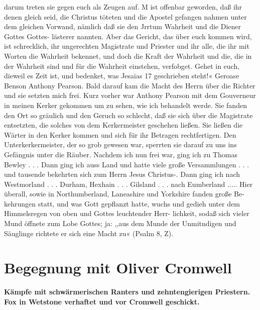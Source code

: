 darum treten sie gegen euch als Zeugen auf. M ist offenbar
geworden, daß ihr denen gleich seid, die Christus töteten und die
Apostel gefangen nahmen unter dem gleichen Vorwand, nämlich
daß sie den Jrrtum Wahrheit und die Diener Gottes Gottes-
lästerer nannten. Aber das Gericht, das über euch kommen wird,
ist schrecklich, ihr ungerechten Magistrate und Priester und ihr
alle, die ihr mit Worten die Wahrheit bekennet, und doch die
Kraft der Wahrheit und die, die in der Wahrheit sind und für die
Wahrheit einstehen, verfobget. Gehet in euch, dieweil es Zeit
ist, und bedenket, was Jesaias 17 geschrieben steht!«
Geroase Benson
Anthony Pearson.
Bald darauf kam die Macht des Herrn über die Richter
und sie setzten mich frei. Kurz vorher war Anthony Pearson
mit dem Gouverneur in meinen Kerker gekommen um zu sehen,
wie ich behandelt werde. Sie fanden den Ort so gräulich und
den Geruch so schlecht, daß sie sich über die Magistrate entsetzten,
die solches von dem Kerkermeister geschehen ließen. Sie ließen
die Wärter in den Kerker kommen und sich für ihr Betragen
rechtfertigen. Den Unterkerkermeister, der so grob gewesen war,
sperrten sie darauf zu uns ins Gefängnis unter die Räuber.
Nachdem ich nun frei war, ging ich zu Thomas Bewley . . .
Dann ging ich auss Land und hatte viele große Versammlungen . . .
und tausende bekehrten sich zum Herrn Jesus Christus-.
Dann ging ich nach Westmorland . . . Durham, Hexhain . . .
Gilsland . . . nach Eumberland ..... Hier überall, sowie in
Northumberland, Laneashire und Yorkshire fanden große Be-
kehrungen statt, und was Gott gepflanzt hatte, wuchs und gedieh
unter dem Himmelsregen von oben und Gottes leuchtender Herr-
lichkeit, sodaß sich vieler Mund öffnete zum Lobe Gottes; ja: ,,aus
dem Munde der Unmitndigen und Säuglinge richtete er sich eine
Macht zu« (Psalm 8, Z).




\chapter[Begegnung mit Oliver Cromwell]{Begegnung mit Oliver Cromwell}

\begin{center}
\textbf{Kämpfe mit schwärmerischen Ranters und 
zehntengierigen Priestern.
Fox in Wetstone verhaftet und vor Cromwell geschickt.}
\end{center}


